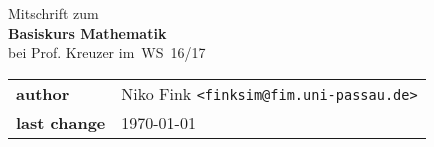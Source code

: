 \documentclass[a4paper,10pt]{article}
\begin{document}
\begin{titlepage}
	\begin{center}
		\huge Mitschrift zum \\
		\Huge \textbf{Basiskurs Mathematik} \\
		\huge bei Prof. Kreuzer im WS 16/17 \\
		\normalsize

		\vspace{1cm}
		\begin{tabular}[b]{l|l}
			\textbf{author} & Niko Fink \texttt{<finksim@fim.uni-passau.de>} \\
			\textbf{last change} & \today
		\end{tabular}

		\vspace{1cm}
		\tableofcontents
	\end{center}
\end{titlepage}

\setcounter{section}{9}




\end{document}
